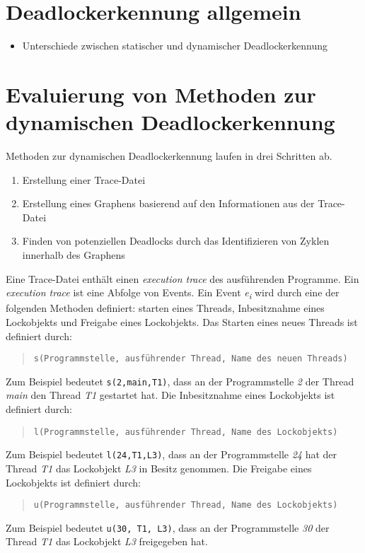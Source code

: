 \section{Deadlockerkennung allgemein}
\begin{itemize}
  \item Unterschiede zwischen statischer und dynamischer Deadlockerkennung
\end{itemize}

\section{Evaluierung von Methoden zur dynamischen Deadlockerkennung}
Methoden zur dynamischen Deadlockerkennung laufen in drei Schritten ab.
\begin{enumerate}
  \item Erstellung einer Trace-Datei
  \item Erstellung eines Graphens basierend auf den Informationen aus der
  Trace-Datei
  \item Finden von potenziellen Deadlocks durch das Identifizieren von Zyklen
  innerhalb des Graphens
\end{enumerate}

Eine Trace-Datei enthält einen \textit{execution trace} des ausführenden
Programme. Ein \textit{execution trace} ist eine Abfolge von Events. Ein Event
\textit{e\textsubscript{i}} wird durch eine der folgenden Methoden definiert:
starten eines Threads, Inbesitznahme eines Lockobjekts und Freigabe eines
Lockobjekts. Das Starten eines neues Threads ist definiert durch:
\begin{quote}
\texttt{s(Programmstelle, ausführender Thread, Name des neuen Threads)}
\end{quote}
Zum Beispiel bedeutet \texttt{s(2,main,T1)}, dass an der Programmstelle
\textit{2} der Thread \textit{main} den Thread \textit{T1} gestartet hat. 
Die Inbesitznahme eines Lockobjekts ist definiert durch:
\begin{quote}
\texttt{l(Programmstelle, ausführender Thread, Name des Lockobjekts)}
\end{quote}
Zum Beispiel bedeutet \texttt{l(24,T1,L3)}, dass
an der Programmstelle \textit{24} hat der Thread \textit{T1} das Lockobjekt
\textit{L3} in Besitz genommen. Die Freigabe eines Lockobjekts ist definiert
durch:
\begin{quote}
\texttt{u(Programmstelle, ausführender Thread, Name des Lockobjekts)}
\end{quote}
Zum Beispiel bedeutet \texttt{u(30, T1, L3)}, dass an der Programmstelle
\textit{30} der Thread \textit{T1} das Lockobjekt \textit{L3} freigegeben hat.


